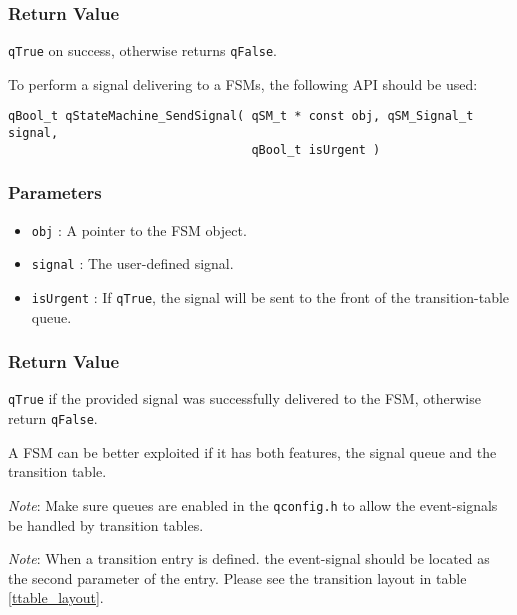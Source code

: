 \subsubsection*{Return Value}
\lstinline{qTrue} on success, otherwise returns \lstinline{qFalse}.

\hrulefill
\medskip

To perform a signal delivering to a FSMs, the following API should be used:
\medskip

\begin{lstlisting}[style=CStyle]
qBool_t qStateMachine_SendSignal( qSM_t * const obj, qSM_Signal_t signal, 
                                  qBool_t isUrgent )
\end{lstlisting} 

\subsubsection*{Parameters}
\begin{itemize}
    \item \lstinline{obj} : A pointer to the FSM object. 
    \item \lstinline{signal} : The user-defined signal.
    \item \lstinline{isUrgent} : If \lstinline{qTrue}, the signal will be sent to the front of the transition-table queue.
\end{itemize}

\subsubsection*{Return Value}
\lstinline{qTrue} if the provided signal was successfully delivered to the FSM, otherwise return \lstinline{qFalse}.

\hrulefill
\medskip

\begin{tcolorbox}
\HandRight A FSM can be better exploited if it has both features, the signal queue and the transition table.
\end{tcolorbox}

\begin{tcolorbox}
\ArrowBoldDownRight \textit{Note}: Make sure queues are enabled in the \lstinline{qconfig.h} to allow the event-signals be handled by transition tables.
\end{tcolorbox}


\begin{tcolorbox}
\ArrowBoldDownRight \textit{Note}: When a transition entry is defined. the event-signal should be located as the second parameter of the entry. Please see the transition layout in table \ref{ttable_layout}.
\end{tcolorbox}

